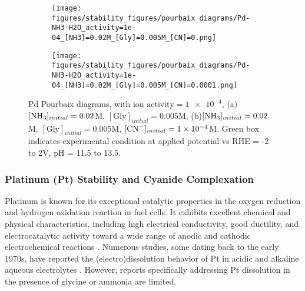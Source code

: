 \documentclass[journal=jacsat,manuscript=article]{achemso}
\begin{document}
\begin{figure}[htbp]
    \centering
    \begin{subfigure}[b]{0.45\textwidth}
        \subcaption{}\label{fig:Pd_Pourbaix_NH3_Gly}
        \texttt{[image: figures/stability\_figures/pourbaix\_diagrams/Pd-NH3-H2O\_activity=1e-04\_[NH3]=0.02M\_[Gly]=0.005M\_[CN]=0.png]}
    \end{subfigure}
    \begin{subfigure}[b]{0.45\textwidth}
        \subcaption{}\label{fig:Pd_Pourbaix_NH3_Gly_CN}
        \texttt{[image: figures/stability\_figures/pourbaix\_diagrams/Pd-NH3-H2O\_activity=1e-04\_[NH3]=0.02M\_[Gly]=0.005M\_[CN]=0.0001.png]}
    \end{subfigure}

    \caption{Pd Pourbaix diagrams, with $\text{ion activity}=\num{1e-4}$, (a)$[\ce{NH3}]_{initial}= 0.02$M, $[\text{Gly}]_{initial}=0.005$M, (b)$[\ce{NH3}]_{initial}= 0.02$M, $[\text{Gly}]_{initial}=0.005$M,  $[\ce{CN-}]_{initial}=\num{1e-4}$M. Green box indicates experimental condition at applied potential vs RHE = -2 to 2V, pH = 11.5 to 13.5.}
    \label{fig:Pd_Pourbaix}
\end{figure}


\subsubsection{Platinum (Pt) Stability and Cyanide Complexation}

Platinum is known for its exceptional catalytic properties \cite{Debe2012ElectrocatalystCells, Daubinger2014ElectrochemicalStudy} in the oxygen reduction and hydrogen oxidation reaction in fuel cells. It exhibits excellent chemical and physical characteristics, including high electrical conductivity, good ductility, and electrocatalytic activity toward a wide range of anodic and cathodic electrochemical reactions \cite{Jerkiewicz2022ApplicabilityResearch}. Numerous studies, some dating back to the early 1970s, have reported the (electro)dissolution behavior of Pt in acidic and alkaline aqueous electrolytes \cite{Rand1972AVoltammetry, Tian2016InfluenceConditions, Xing2014PlatinumCycling}. However, reports specifically addressing Pt dissolution in the presence of glycine or ammonia are limited.
\end{document}
